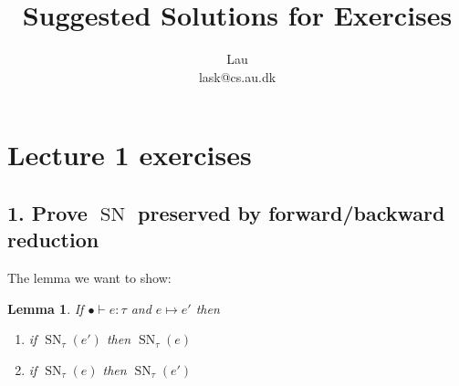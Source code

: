 \documentclass[a4paper,10pt,fleqn]{article}
\author{Lau\\lask@cs.au.dk}
\title{Suggested Solutions for Exercises}
\DeclareMathOperator{\SNPred}{SN}
\newcommand{\evalto}{\ensuremath{\mapsto}}
\newcommand{\mtenv}{\ensuremath{\bullet}}
\newcommand{\SN}[2]{\ensuremath{\SNPred_{#1}(#2)}}
\newtheorem*{lemma}{Lemma}
\begin{document}
\maketitle
\section*{Lecture 1 exercises}
\subsection*{1. Prove $\SNPred$ preserved by forward/backward reduction}
The lemma we want to show:
\begin{lemma}
  If $\mtenv \vdash e : \tau$ and $e \evalto e'$ then
  \begin{enumerate}
  \item if $\SN{\tau}{e'}$ then $\SN{\tau}{e}$
  \item if $\SN{\tau}{e}$ then $\SN{\tau}{e'}$
  \end{enumerate}
\end{lemma}
\end{document}
